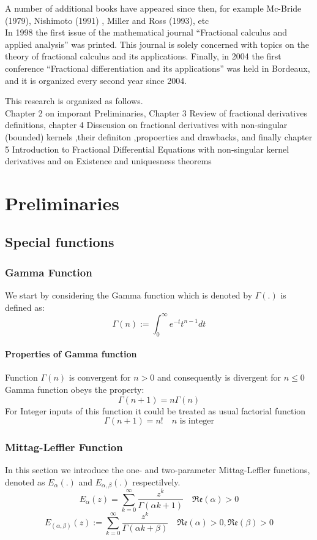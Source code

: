 \documentclass[twoside]{book}
\begin{document}
{A number of additional books have appeared since then, for example Mc-Bride (1979), Nishimoto (1991)
, Miller and Ross (1993), etc \\
In 1998 the first issue of
the mathematical journal “Fractional calculus and applied analysis” was printed. This journal is solely
concerned with topics on the theory of fractional calculus and its applications. Finally, in 2004 the first
conference “Fractional differentiation and its applications” was held in Bordeaux, and it is organized every
second year since 2004.



\vspace{3em}
This research is organized as follows.\\
Chapter 2 on imporant Preliminaries, Chapter 3 Review of fractional derivatives definitions, chapter 4 Disscusion on fractional derivatives with non-singular (bounded) kernels ,their definiton ,propoerties and drawbacks, and finally chapter 5 Introduction to Fractional Differential Equations with non-singular kernel derivatives and on Existence and uniquesness theorems
\chapter{Preliminaries}

\section*{Special functions}
\subsection*{Gamma Function}
We start by considering the Gamma function which is denoted by $\Gamma{(.)}$ is defined as:
$$\Gamma{(n)} := \int_0^\infty e^{-t}t^{n-1} dt $$
\subsubsection*{Properties of Gamma function}
Function $\Gamma{(n)}$ is convergent for $n>0$ and consequently is divergent for $n \leq 0$\\
Gamma function obeys the property:
$$\Gamma{(n+1)} = n \Gamma{(n)}$$
For Integer inputs of this function it could be treated as usual factorial function
$$\Gamma{(n+1)} = n! \quad n \text{  is integer}$$
\subsection*{Mittag-Leffler Function}
In this section we introduce the one- and two-parameter Mittag-Leffler functions, denoted as $E_\alpha (.)$ and $E_{\alpha ,\beta} (.)$ respectilvely.
$$E_\alpha (z) = \sum_{k=0}^\infty \frac{z^k}{\Gamma{(\alpha k +1)}} \quad \mathfrak{Re}(\alpha) > 0$$
$$E_{(\alpha,\beta)}(z) := \sum_{k=0}^\infty \frac{z^k}{\Gamma{(\alpha k +\beta)}}  \quad \mathfrak{Re}(\alpha) > 0 , \mathfrak{Re}(\beta) > 0$$

}
\end{document}
